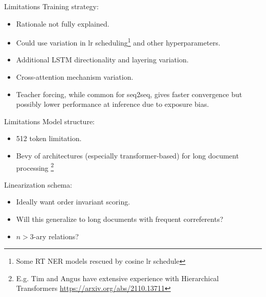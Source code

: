 \documentclass[usenames,dvipsnames,pdf]{beamer}
\begin{document}
        \begin{frame}{Limitations}
          Training strategy:
          \begin{itemize}
          \item
            Rationale not fully explained.
          \item
            Could use variation in lr scheduling\footnote{Some RT NER models rescued by cosine lr schedule} and other hyperparameters.
          \item
            Additional LSTM directionality and layering variation.
          \item
            Cross-attention mechanism variation.
          \item
            Teacher forcing, while common for seq2seq,
            gives faster convergence but possibly lower performance at inference due to exposure bias.  
          \end{itemize}
        \end{frame}

        \begin{frame}{Limitations}
          Model structure:
          \begin{itemize}
          \item
            512 token limitation.
          \item
            Bevy of architectures (especially transformer-based) for long document processing
            \footnote{E.g. Tim and Angus have extensive experience with Hierarchical Transformers
            \url{https://arxiv.org/abs/2110.13711}}  
          
            
          \end{itemize}
          Linearization schema:
          \begin{itemize}
          \item
            Ideally want order invariant scoring.
          \item
            Will this generalize to long documents with frequent correferents?
          \item
            $n>3$-ary relations?
          \end{itemize}
        \end{frame}
        
\end{document}
